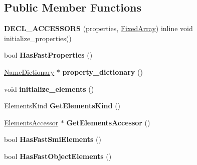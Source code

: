 \subsection*{Public Member Functions}
\begin{DoxyCompactItemize}
\item 
\hypertarget{classv8_1_1internal_1_1_j_s_object_a3be9f7e9119117eb31285192385917cb}{}{\bfseries D\+E\+C\+L\+\_\+\+A\+C\+C\+E\+S\+S\+O\+R\+S} (properties, \hyperlink{classv8_1_1internal_1_1_fixed_array}{Fixed\+Array}) inline void initialize\+\_\+properties()\label{classv8_1_1internal_1_1_j_s_object_a3be9f7e9119117eb31285192385917cb}

\item 
\hypertarget{classv8_1_1internal_1_1_j_s_object_af61b8863230084ce2b6524a9194e9c2b}{}bool {\bfseries Has\+Fast\+Properties} ()\label{classv8_1_1internal_1_1_j_s_object_af61b8863230084ce2b6524a9194e9c2b}

\item 
\hypertarget{classv8_1_1internal_1_1_j_s_object_af9a93ec1fe1322e90413ddf3fc39518e}{}\hyperlink{classv8_1_1internal_1_1_name_dictionary}{Name\+Dictionary} $\ast$ {\bfseries property\+\_\+dictionary} ()\label{classv8_1_1internal_1_1_j_s_object_af9a93ec1fe1322e90413ddf3fc39518e}

\item 
\hypertarget{classv8_1_1internal_1_1_j_s_object_a83339557af10b946ff90e16dbf35c27a}{}void {\bfseries initialize\+\_\+elements} ()\label{classv8_1_1internal_1_1_j_s_object_a83339557af10b946ff90e16dbf35c27a}

\item 
\hypertarget{classv8_1_1internal_1_1_j_s_object_ad5fd4f169b297912db619ab606aa2af9}{}Elements\+Kind {\bfseries Get\+Elements\+Kind} ()\label{classv8_1_1internal_1_1_j_s_object_ad5fd4f169b297912db619ab606aa2af9}

\item 
\hypertarget{classv8_1_1internal_1_1_j_s_object_a64721eeac95d6da0cd947f4438fda365}{}\hyperlink{classv8_1_1internal_1_1_elements_accessor}{Elements\+Accessor} $\ast$ {\bfseries Get\+Elements\+Accessor} ()\label{classv8_1_1internal_1_1_j_s_object_a64721eeac95d6da0cd947f4438fda365}

\item 
\hypertarget{classv8_1_1internal_1_1_j_s_object_aacb600c9779e10c68ac2d4a4cab72bd8}{}bool {\bfseries Has\+Fast\+Smi\+Elements} ()\label{classv8_1_1internal_1_1_j_s_object_aacb600c9779e10c68ac2d4a4cab72bd8}

\item 
\hypertarget{classv8_1_1internal_1_1_j_s_object_a27a5f093714dc595d472ebadc3c90031}{}bool {\bfseries Has\+Fast\+Object\+Elements} ()\label{classv8_1_1internal_1_1_j_s_object_a27a5f093714dc595d472ebadc3c90031}


\end{DoxyCompactItemize}
